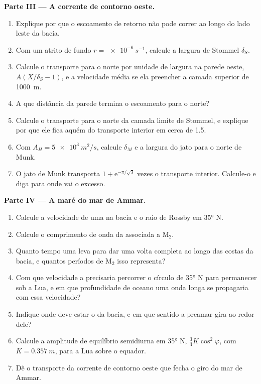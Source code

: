 \begin{problem}
\medskip\noindent\textbf{Parte III --- A corrente de contorno oeste.}
\begin{enumerate}[resume]
\item Explique por que o escoamento de retorno não pode correr ao longo do lado leste da
  bacia.
\item Com um atrito de fundo $r = \qty{e-6}{s^{-1}}$, calcule a
  largura de Stommel $\delta_S$.
\item Calcule o transporte para o norte por unidade de largura na parede oeste,
  $A(X/\delta_S - 1)$, e a velocidade média se ela preencher a
  camada superior de \qty{1000}{m}.
\item A que distância da parede termina o escoamento para o norte?
\item Calcule o transporte para o norte da camada limite de Stommel, e
  explique por que ele fica aquém do transporte interior em cerca de
  \qty{1.5}{\sverdrup}.
\item Com $A_H = \qty{5e3}{m^2/s}$, calcule $\delta_M$ e a largura do
  jato para o norte de Munk.
\item O jato de Munk transporta $1 + \mathrm e^{-\pi/\sqrt3}$ vezes o
  transporte interior. Calcule-o e diga para onde vai o excesso.
\end{enumerate}

\medskip\noindent\textbf{Parte IV --- A maré do mar de Ammar.}
\begin{enumerate}[resume]
\item Calcule a velocidade de uma  na bacia e o raio de Rossby
  em \ang{35} N.
\item Calcule o comprimento de onda da  associada a M$_2$.
\item Quanto tempo uma  leva para dar uma volta completa ao longo das costas da
  bacia, e quantos períodos de M$_2$ isso representa?
\item Com que velocidade a  precisaria percorrer o
  círculo de \ang{35} N para permanecer sob a Lua, e em que profundidade de oceano
  uma onda longa se propagaria com essa velocidade?
\item Indique onde deve estar o  da bacia, e em que
  sentido a preamar gira ao redor dele?
\item Calcule a amplitude de equilíbrio semidiurna em \ang{35} N, $\tfrac34
  K\cos^2\varphi$, com $K = \qty{0.357}{m}$, para a Lua sobre o equador.
\item Dê o transporte da corrente de contorno oeste que fecha o
  giro do mar de Ammar.
\end{enumerate}
\end{problem}
